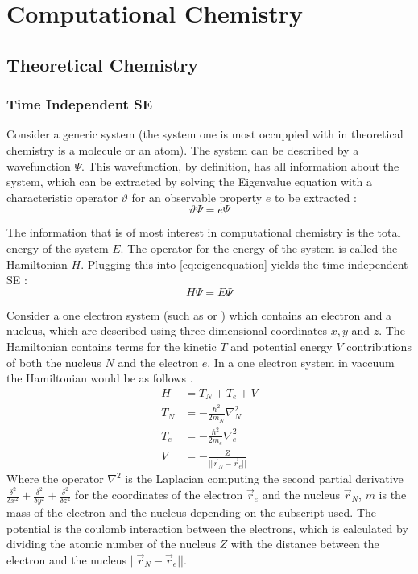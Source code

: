 \documentclass[../master_thesis.tex]{subfiles}
\begin{document}
\chapter{Computational Chemistry}
\section{Theoretical Chemistry}
\subsection{Time Independent \ac{SE}}

Consider a generic system (the system one is most occuppied with in theoretical
chemistry is a molecule or an atom). The system can be described by a
wavefunction $\Psi$. This wavefunction, by definition, has all information
about the system, which can be extracted by solving the Eigenvalue equation
with a characteristic operator $\vartheta$ for an observable property $ e $ to
 be extracted \cite{Cramer:2004}:
\begin{equation}
  \vartheta\Psi = e\Psi\label{eq:eigenequation}
\end{equation}

The information that is of most interest in computational chemistry is the
total energy of the system $ E $. The operator for the energy of the system is
called the Hamiltonian $H$. Plugging this into \ref{eq:eigenequation} yields
the time independent \ac{SE} \cite{Cramer:2004, Jensen:2017}:
\begin{equation}
  H\Psi = E\Psi\label{eq:SE}
\end{equation}

Consider a one electron system (such as  or ) which contains an
electron and a nucleus, which are described using three dimensional coordinates
$ x, y $ and $ z $. The Hamiltonian contains terms for the kinetic $T$ and
potential energy $V$ contributions of both the nucleus $ N $ and the electron
$ e $. In a one electron system in vaccuum the Hamiltonian would be as follows
\cite{Jensen:2017, Cramer:2004}.
\begin{equation}
  \begin{aligned}
    H   &= T_N + T_e + V \\
    T_N &= -\frac{\hbar^2}{2m_N}\nabla^2_N \\
    T_e &= -\frac{\hbar^2}{2m_e}\nabla^2_e \\
    V   &= -\frac{Z}{||\vec{r}_N - \vec{r}_e||} \label{eq:twopH}
  \end{aligned}
\end{equation}
Where the operator $ \nabla^2$ is the Laplacian computing the second partial
derivative $ \frac{\delta^2}{\delta x^2} + \frac{\delta^2}{\delta y^2} +
\frac{\delta^2}{\delta z^2} $ for the coordinates of the electron $\vec{r}_e$
and the nucleus $\vec{r}_N$, $ m $ is the mass of the electron and the nucleus
depending on the subscript used. The potential is the coulomb interaction
between the electrons, which is calculated by dividing the atomic number of the
nucleus $ Z $ with the distance between the electron and the nucleus
$ ||\vec{r}_N - \vec{r}_e|| $.
\end{document}
